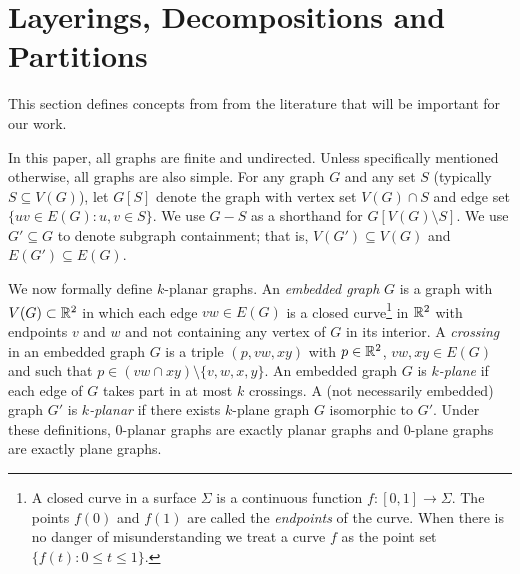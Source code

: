 \documentclass{patmorin}
\newcommand{\note}[2]{{\color{red}[#1:~#2]}}
\renewcommand{\le}{\leqslant}
\begin{document}




\section{Layerings, Decompositions and Partitions}
\label{Tools}

This section defines concepts from from the literature that will be important for our work. 

In this paper, all graphs are finite and undirected. Unless specifically mentioned otherwise, all graphs are also simple. For any graph $G$ and any set $S$ (typically $S\subseteq V(G)$), let $G[S]$  denote the graph with vertex set $V(G)\cap S$ and edge set $\{uv\in E(G) : u,v\in S\}$.  We use $G-S$ as a shorthand for $G[V(G)\setminus S]$. We use $G'\subseteq G$ to denote subgraph containment; that is, $V(G')\subseteq V(G)$ and $E(G')\subseteq E(G)$.

We now formally define $k$-planar graphs.  An \emph{embedded graph} $G$ is a graph with $V(G)\subset\mathbb{R}^2$ in which each edge $vw\in E(G)$ is a closed curve\footnote{A closed curve in a surface $\Sigma$ is a continuous function $f:[0,1]\to \Sigma$. The points $f(0)$ and $f(1)$ are called the \emph{endpoints} of the curve.  When there is no danger of misunderstanding we treat a curve $f$ as the point set $\{f(t):0\le t\le 1\}$.} in $\mathbb{R}^2$ with endpoints $v$ and $w$ and not containing any vertex of $G$ in its interior.  A \emph{crossing} in an embedded graph $G$ is a triple $(p,vw,xy)$ with $p\in\mathbb{R}^2$, $vw,xy\in E(G)$ and such that $p\in (vw\cap xy)\setminus\{v,w,x,y\}$. An embedded graph $G$ is \emph{$k$-plane} if each edge of $G$ takes part in at most $k$ crossings.  A (not necessarily embedded) graph $G'$ is \emph{$k$-planar} if there exists $k$-plane graph $G$ isomorphic to $G'$.  Under these definitions, $0$-planar graphs are exactly planar graphs and $0$-plane graphs are exactly plane graphs. 
\end{document}
